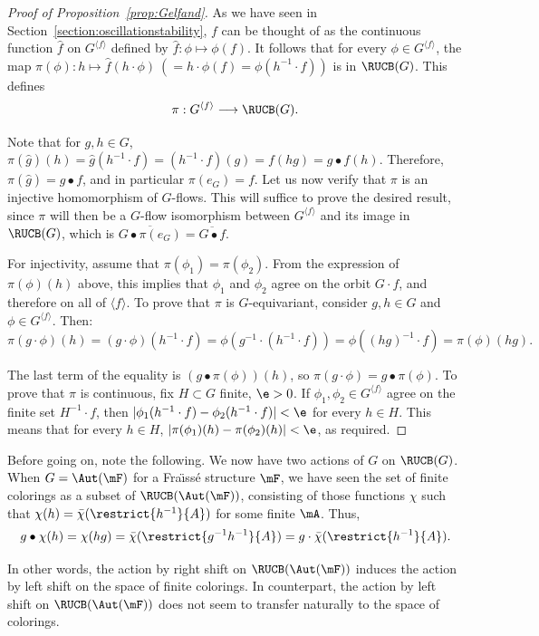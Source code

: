 \begin{proof}[Proof of Proposition~\ref{prop:Gelfand}]
As we have seen in Section~\ref{section:oscillationstability}, $f$ can be thought of as the continuous function $\hat f$ on $G^{\langle f \rangle}$ defined by $\hat f:\phi\mapsto \phi(f)$. It follows that for every $\phi\in G^{\langle f \rangle}$, the map $\pi(\phi):h\mapsto \hat f (h\cdot \phi) \ (=h\cdot \phi(f) = \phi(h^{-1}\cdot f))$ is in $\RUCB(G)$. This defines
\[
\pi:G^{\langle f \rangle}\longrightarrow \RUCB(G).
\]

Note that for $g,h\in G$, $\pi(\hat g)(h)=\hat g(h^{-1}\cdot f)=(h^{-1}\cdot f)(g)=f(hg)=g\bullet f(h)$. Therefore, $\pi(\hat g)=g\bullet f$, and in particular $\pi(e_{G})=f$. Let us now verify that $\pi$ is an injective homomorphism of $G$-flows. This will suffice to prove the desired result, since $\pi$ will then be a $G$-flow isomorphism between $G^{\langle f \rangle}$ and its image in $ \RUCB(G)$, which is $\overline{G\bullet \pi(e_{G})}=\overline{G\bullet f}$.

For injectivity, assume that $\pi(\phi_{1})=\pi(\phi_{2})$. From the expression of $\pi(\phi)(h)$ above, this implies that $\phi_{1}$ and $\phi_{2}$ agree on the orbit $G\cdot f$, and therefore on all of $\langle f \rangle$. To prove that $\pi$ is $G$-equivariant, consider $g,h\in G$ and $\phi\in G^{\langle f \rangle}$. Then:
\[
\pi(g\cdot \phi)(h)=(g\cdot \phi)(h^{-1}\cdot f)=\phi(g^{-1}\cdot(h^{-1}\cdot f))=\phi((hg)^{-1}\cdot f)=\pi(\phi)(hg).
\]

The last term of the equality is $(g\bullet\pi(\phi))(h)$, so $\pi(g\cdot \phi)=g\bullet\pi(\phi)$. To prove that $\pi$ is continuous, fix $H\subset G$ finite, $\e>0$. If $\phi_{1}, \phi_{2}\in G^{\langle f \rangle}$ agree on the finite set $H^{-1}\cdot f$, then $|\phi_{1}(h^{-1}\cdot f)-\phi_{2}(h^{-1}\cdot f)|<\e$ for every $h\in H$. This means that for every $h\in H$, $|\pi(\phi_{1})(h)-\pi(\phi_{2})(h)|<\e$, as required.
\end{proof}

Before going on, note the following. We now have two actions of $G$ on $\RUCB(G)$. When $G=\Aut(\mF)$ for a Fra\"{\i}ss\'e structure $\mF$, we have seen the set of finite colorings as a subset of $\RUCB(\Aut(\mF))$, consisting of those functions $\chi$ such that $\chi(h)=\bar{\chi}({\restrict{h^{-1}}{A}})$ for some finite $\mA$. Thus,
\[
g\bullet \chi (h) = \chi(hg)=\bar\chi(\restrict{g^{-1}h^{-1}}{A})=g\cdot\bar\chi(\restrict{h^{-1}}{A}).
\]

In other words, the action by right shift on $\RUCB(\Aut(\mF))$ induces the action by left shift on the space of finite colorings. In counterpart, the action by left shift on $\RUCB(\Aut(\mF))$ does not seem to transfer naturally to the space of colorings.

